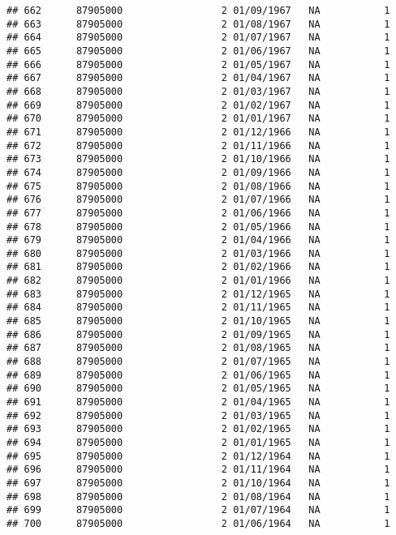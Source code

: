 \documentclass[
]{article}
\begin{document}
\begin{verbatim}
## 662      87905000                 2 01/09/1967   NA           1
## 663      87905000                 2 01/08/1967   NA           1
## 664      87905000                 2 01/07/1967   NA           1
## 665      87905000                 2 01/06/1967   NA           1
## 666      87905000                 2 01/05/1967   NA           1
## 667      87905000                 2 01/04/1967   NA           1
## 668      87905000                 2 01/03/1967   NA           1
## 669      87905000                 2 01/02/1967   NA           1
## 670      87905000                 2 01/01/1967   NA           1
## 671      87905000                 2 01/12/1966   NA           1
## 672      87905000                 2 01/11/1966   NA           1
## 673      87905000                 2 01/10/1966   NA           1
## 674      87905000                 2 01/09/1966   NA           1
## 675      87905000                 2 01/08/1966   NA           1
## 676      87905000                 2 01/07/1966   NA           1
## 677      87905000                 2 01/06/1966   NA           1
## 678      87905000                 2 01/05/1966   NA           1
## 679      87905000                 2 01/04/1966   NA           1
## 680      87905000                 2 01/03/1966   NA           1
## 681      87905000                 2 01/02/1966   NA           1
## 682      87905000                 2 01/01/1966   NA           1
## 683      87905000                 2 01/12/1965   NA           1
## 684      87905000                 2 01/11/1965   NA           1
## 685      87905000                 2 01/10/1965   NA           1
## 686      87905000                 2 01/09/1965   NA           1
## 687      87905000                 2 01/08/1965   NA           1
## 688      87905000                 2 01/07/1965   NA           1
## 689      87905000                 2 01/06/1965   NA           1
## 690      87905000                 2 01/05/1965   NA           1
## 691      87905000                 2 01/04/1965   NA           1
## 692      87905000                 2 01/03/1965   NA           1
## 693      87905000                 2 01/02/1965   NA           1
## 694      87905000                 2 01/01/1965   NA           1
## 695      87905000                 2 01/12/1964   NA           1
## 696      87905000                 2 01/11/1964   NA           1
## 697      87905000                 2 01/10/1964   NA           1
## 698      87905000                 2 01/08/1964   NA           1
## 699      87905000                 2 01/07/1964   NA           1
## 700      87905000                 2 01/06/1964   NA           1

\end{verbatim}
\end{document}
